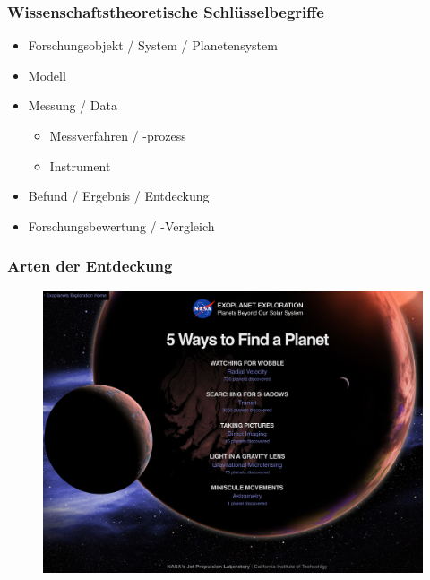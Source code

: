 \documentclass[11pt]{beamer}
\begin{document}
	\begin{frame}
	\frametitle{Wissenschaftstheoretische Schlüsselbegriffe}
	\begin{itemize}
		\item Forschungsobjekt / System / Planetensystem
		\item Modell
		\item Messung / Data
		\begin{itemize}
			\item Messverfahren / -prozess
			\item Instrument
		\end{itemize}
		\item Befund / Ergebnis / Entdeckung
		\item Forschungsbewertung / -Vergleich
	\end{itemize}
\end{frame}


\begin{frame}
	\frametitle{Arten der Entdeckung}
	\begin{figure}
		\centering
		\includegraphics[width=1\linewidth]{screenshot004}
		\caption{}
		\label{fig:screenshot004}
	\end{figure}
	
\end{frame}
\end{document}
